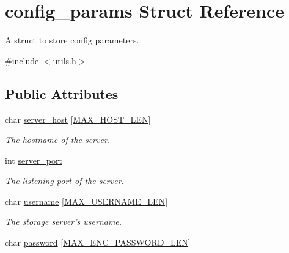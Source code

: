 \hypertarget{structconfig__params}{\section{config\-\_\-params Struct Reference}
\label{structconfig__params}
}


A struct to store config parameters.  




{\ttfamily \#include $<$utils.\-h$>$}

\subsection*{Public Attributes}
\begin{DoxyCompactItemize}
\item 
\hypertarget{structconfig__params_a962b7bcdbee26333fa776115ed066fb3}{char \hyperlink{structconfig__params_a962b7bcdbee26333fa776115ed066fb3}{server\-\_\-host} \mbox{[}\hyperlink{storage_8h_aa746ad89d7f59a152f37e3529057bd58}{M\-A\-X\-\_\-\-H\-O\-S\-T\-\_\-\-L\-E\-N}\mbox{]}}\label{structconfig__params_a962b7bcdbee26333fa776115ed066fb3}

\begin{DoxyCompactList}\small\item\em The hostname of the server. \end{DoxyCompactList}\item 
\hypertarget{structconfig__params_aa7103926e2d35a5d3461a5081723bdcd}{int \hyperlink{structconfig__params_aa7103926e2d35a5d3461a5081723bdcd}{server\-\_\-port}}\label{structconfig__params_aa7103926e2d35a5d3461a5081723bdcd}

\begin{DoxyCompactList}\small\item\em The listening port of the server. \end{DoxyCompactList}\item 
\hypertarget{structconfig__params_a4793ceaa4b04decbe50ff4fa9fdde145}{char \hyperlink{structconfig__params_a4793ceaa4b04decbe50ff4fa9fdde145}{username} \mbox{[}\hyperlink{storage_8h_a6c4647395896246d6710ba980c31666c}{M\-A\-X\-\_\-\-U\-S\-E\-R\-N\-A\-M\-E\-\_\-\-L\-E\-N}\mbox{]}}\label{structconfig__params_a4793ceaa4b04decbe50ff4fa9fdde145}

\begin{DoxyCompactList}\small\item\em The storage server's username. \end{DoxyCompactList}\item 
\hypertarget{structconfig__params_a287adb79846d3b33b2e2bdd0cd12f901}{char \hyperlink{structconfig__params_a287adb79846d3b33b2e2bdd0cd12f901}{password} \mbox{[}\hyperlink{storage_8h_aa13f93b74a500b0fd36cf2fd2fa5f30b}{M\-A\-X\-\_\-\-E\-N\-C\-\_\-\-P\-A\-S\-S\-W\-O\-R\-D\-\_\-\-L\-E\-N}\mbox{]}}\label{structconfig__params_a287adb79846d3b33b2e2bdd0cd12f901}


\end{DoxyCompactItemize}
